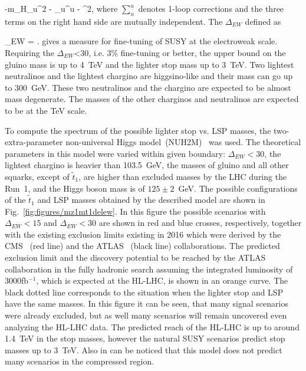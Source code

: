 {
 \simeq -m_{H_{u}}^{2} - \sum_{u}^{u} - \mu^{2},
}
where $\sum_{u}^{u}$ denotes 1-loop corrections and the three terms on the right hand side are mutually independent. The $\Delta_{EW}$ defined as

{
\Delta_{EW} = .
}
gives a measure for fine-tuning of SUSY at the electroweak scale. Requiring the $\Delta_{EW}$<30, i.e. 3\% fine-tuning or better, the upper bound on the gluino mass is up to 4~TeV and the lighter stop mass up to 3~TeV. Two  lightest neutralinos and the lightest chargino are higgsino-like and their mass can go up to 300~GeV. These two neutralinos and the chargino are expected to be almost mass degenerate. The masses of the other charginos and neutralinos are expected to be at the TeV scale.

To compute the spectrum of the possible lighter stop vs. LSP masses, the two-extra-parameter non-universal Higgs model~(NUH2M)~\cite{Matalliotakis:1994ft, Nath:1997qm, Ellis:2002iu, Baer:2005bu} was used. The theoretical parameters in this model were varied within given boundary: $\Delta_{EW} <30$, the lightest chargino is heavier than 103.5~GeV, the masses of gluino and all other squarks,  except of $\tilde{t}_{1}$, are higher than excluded masses by the LHC during the Run~1, and the Higgs boson mass is of $125 \pm 2$~GeV. The possible configurations of the $\tilde{t}_{1}$ and LSP masses obtained by the described model are shown in Fig.~\ref{fig:figures/mz1mt1delew}. In this figure the possible scenarios with $\Delta_{EW} <15$ and $\Delta_{EW} <30$ are shown in red and blue crosses, respectively, together with the existing exclusion limits existing in 2016 which were derived by the CMS~\cite{CMS:2016hxa} (red line) and the ATLAS~\cite{ATLAS:2016jaa, ATLAS:2016ljb, ATLAS:2016xcm, Aaboud:2016tnv} (black line) collaborations. The predicted exclusion limit and the discovery potential to be reached by the ATLAS collaboration in the fully hadronic search assuming the integrated luminosity of $3000$fb$^{-1}$, which is expected at the HL-LHC, is shown in an orange curve. The black dotted line corresponds to the situation when the lighter stop and LSP have the same masses. In this figure it can be seen, that many signal scenarios were already excluded, but as well many scenarios will remain uncovered even analyzing the HL-LHC data. The predicted reach of the HL-LHC is up to around 1.4~TeV in the stop masses, however the natural SUSY scenarios predict stop masses up to 3~TeV. Also in can be noticed that this model does not predict many scenarios in the compressed region.  

